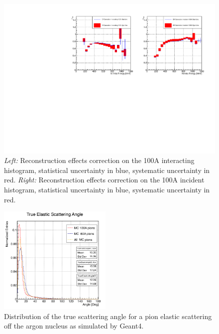\begin{figure}[p]
\centering
\includegraphics[width=\textwidth]{Chapter-6/Images/100AEffCorr.pdf}
\caption{\emph{Left:} Reconstruction effects correction on the 100A interacting histogram, statistical uncertainty in blue, systematic uncertainty in red. \emph{Right:}  Reconstruction effects correction on the 100A incident histogram, statistical uncertainty in blue, systematic uncertainty in red.}
\label{fig:EffCorr100A}
\end{figure}



\begin{figure}[p]
\centering
\includegraphics[width=0.48\textwidth]{Chapter-5/Images//cAngleTrue.png}
\caption{Distribution of the true scattering angle for a pion elastic scattering off the argon nucleus as simulated by Geant4.}
\label{fig:trueScatteringAngle}
\end{figure}




\clearpage
